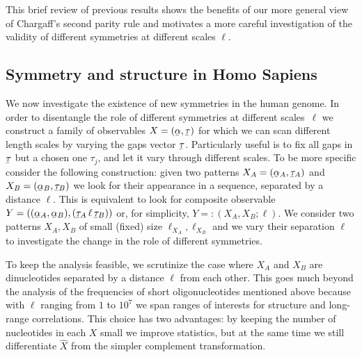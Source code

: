 \documentclass[fleqn,10pt]{wlscirep}
\begin{document}
This brief review of previous results shows the benefits of our more general view of Chargaff's second parity rule and motivates a more careful investigation of the validity of different symmetries at different scales $\ell$.


\subsection*{Symmetry and structure in Homo Sapiens}
 We  now investigate the existence of new symmetries in the human genome. In order to  disentangle the role of different symmetries at different scales~$\ell$ we construct a family of observables $X=(\underaccent{\bar}{\alpha},\underaccent{\bar}{\tau})$ for which we can scan different length scales by varying the gaps vector $\underaccent{\bar}{\tau}$. Particularly useful is to fix all gaps in $\underaccent{\bar}{\tau}$ but a chosen one $\tau_j$, and  let it vary through different scales.  To  be more specific consider the following construction: 
given two patterns $X_A=(\underaccent{\bar}{\alpha}_A, \underaccent{\bar}{\tau}_A)$ and $X_B=(\underaccent{\bar}{\alpha}_B, \underaccent{\bar}{\tau}_B)$ we look for their  appearance in a sequence, separated by a  distance $\ell$. This is equivalent to look for
 composite observable $Y= ((\underaccent{\bar}{\alpha}_A , \underaccent{\bar}{\alpha}_B), (\underaccent{\bar}{\tau}_A\, \ell \, \underaccent{\bar}{\tau}_B))$ or, for simplicity, $Y=:(X_A,X_B; \ell)$.   
 We consider two patterns $X_A,X_B$  of small (fixed) size $\ell_{X_A}, \ell_{X_B}$ and  we vary their separation $\ell$ to investigate the change in the role of different symmetries.
 

 To keep the analysis feasible, we scrutinize the case where $X_A$ and $X_B$ are dinucleotides separated by a distance $\ell$ from each other. This goes much beyond the analysis of the frequencies of short oligonucleotides mentioned above  because with $\ell$ ranging from $1$ to $10^7$ we span ranges of interests for structure and long-range correlations. This choice has two advantages: by keeping the number of nucleotides in  each $X$ small we improve statistics, but at the same time we still differentiate  $\hat{X}$ from the simpler complement transformation. 
% 
%
\end{document}
